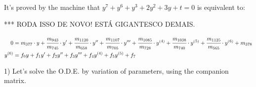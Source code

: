 \documentclass[12pt]{article}
\begin{document}
It's proved by the machine that $y^7 + y^6 + y^3 + 2 y^2 + 3y + t = 0$ is equivalent to:

*** RODA ISSO DE NOVO! EST\'A GIGANTESCO DEMAIS.

\begin{align}
0 &= m_{377}\cdot y + \cfrac{m_{943}}{m_{745}}\cdot y' + \cfrac{m_{1120}}{m_{658}}\cdot y'' + \cfrac{m_{1107}}{m_{705}}\cdot y''' + \cfrac{m_{1085}}{m_{728}}\cdot y^{(4)} + \cfrac{m_{1038}}{m_{740}}\cdot y^{(5)} + \cfrac{m_{1125}}{m_{565}}\cdot y^{(6)} + m_{378} \\
y^{(6)} &= f_0 y + f_1 y' + f_2 y'' + f_3 y''' + f_4 y^{(4)} + f_5 y^{(5)} + f_7
\end{align}

\vspace{3mm}

1) Let's solve the O.D.E. by variation of parameters, using the companion matrix.
\end{document}
